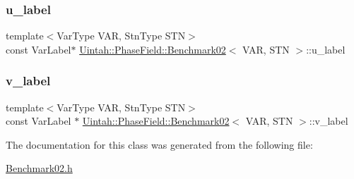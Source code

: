 \subsubsection{\texorpdfstring{u\+\_\+label}{u\_label}}
{\footnotesize\ttfamily template$<$Var\+Type V\+AR, Stn\+Type S\+TN$>$ \\
const Var\+Label$\ast$ \hyperlink{classUintah_1_1PhaseField_1_1Benchmark02}{Uintah\+::\+Phase\+Field\+::\+Benchmark02}$<$ V\+AR, S\+TN $>$\+::u\+\_\+label\hspace{0.3cm}{\ttfamily [protected]}}

\mbox{\label{classUintah_1_1PhaseField_1_1Benchmark02_a34bbefa81a976949d307079736aaf597}} 
\subsubsection{\texorpdfstring{v\+\_\+label}{v\_label}}
{\footnotesize\ttfamily template$<$Var\+Type V\+AR, Stn\+Type S\+TN$>$ \\
const Var\+Label $\ast$ \hyperlink{classUintah_1_1PhaseField_1_1Benchmark02}{Uintah\+::\+Phase\+Field\+::\+Benchmark02}$<$ V\+AR, S\+TN $>$\+::v\+\_\+label\hspace{0.3cm}{\ttfamily [protected]}}



The documentation for this class was generated from the following file\+:\begin{DoxyCompactItemize}
\item 
\hyperlink{Benchmark02_8h}{Benchmark02.\+h}\end{DoxyCompactItemize}
